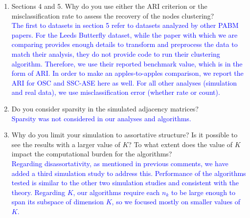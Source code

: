 \documentclass[
]{article}
\begin{document}
\begin{enumerate}
{  Results of this simulation study are very similar to that of the first two and consistent with the theory.
  }\\
  \textcolor{blue}{
  On a related note, it is our view that the distinction between assortative and disassortative is not very important for the PABM, at least when it is viewed as a type of GRDPG. 
  In the case of the SBM and DCBM, it can be shown that the rank of $P$ (and therefore the number of embedding dimensions) is equal to $K$, but assortativity or disassortativity determines how many positive and negative eigenvalues $P$ has \citep{rubindelanchy2017statistical}. 
  In the case of the PABM, the number of positive eigenvalues is always $K (K + 1) / 2$ and the number of negative eigenvalues is always $K (K - 1) / 2$, (assuming each community spans its respective subspace). 
  }
\item
  Sections 4 and 5. Why do you use either the ARI criterion or the
  misclassification rate to assess the recovery of the nodes
  clustering?\\
  \textcolor{blue}{
  The first to datasets in section 5 refer to datasets analyzed by other PABM papers. 
  For the Leeds Butterfly dataset, while the paper with which we are comparing \citep{noroozi2019estimation} provides enough details to transform and preprocess the data to match their analysis, they do not provide code to run their clustering algorithm. 
  Therefore, we use their reported benchmark value, which is in the form of ARI. 
  In order to make an apples-to-apples comparison, we report the ARI for OSC and SSC-ASE here as well. 
  For all other analyses (simulation and real data), we use misclassification error (whether rate or count). 
  }
\item
  Do you consider sparsity in the simulated adjacency matrices?\\
  \textcolor{blue}{
  Sparsity was not considered in our analyses and algorithms.
  }
\item
  Why do you limit your simulation to assortative structure? Is it
  possible to see the results with a larger value of \(K\)? To what
  extent does the value of \(K\) impact the computational burden for the
  algorithms?\\
  \textcolor{blue}{
  Regarding disassortativity, as mentioned in previous comments, we have added a third simulation study to address this. 
  Performance of the algorithms tested is similar to the other two simulation studies and consistent with the theory. 
  Regarding $K$, our algorithms require each $n_k$ to be large enough to span its subspace of dimension $K$, so we focused mostly on smaller values of $K$. 
}
\end{enumerate}
\end{document}
